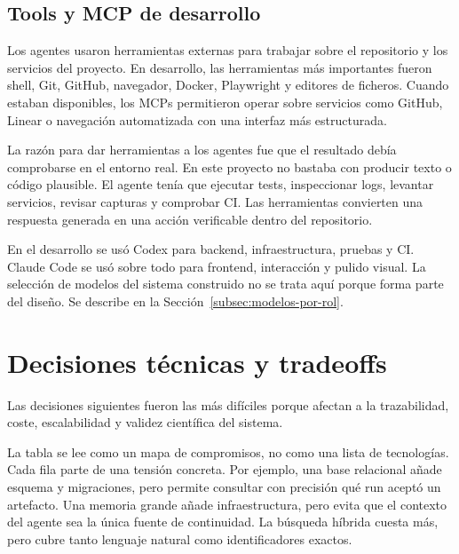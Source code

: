 \subsection{Tools y MCP de desarrollo}

Los agentes usaron herramientas externas para trabajar sobre el repositorio y
los servicios del proyecto. En desarrollo, las herramientas más importantes
fueron shell, Git, GitHub, navegador, Docker, Playwright y editores de ficheros.
Cuando estaban disponibles, los MCPs permitieron operar sobre servicios como
GitHub, Linear o navegación automatizada con una interfaz más estructurada.

La razón para dar herramientas a los agentes fue que el resultado debía
comprobarse en el entorno real. En este proyecto no bastaba con producir texto o
código plausible. El agente tenía que ejecutar tests, inspeccionar logs, levantar
servicios, revisar capturas y comprobar CI. Las herramientas convierten una
respuesta generada en una acción verificable dentro del repositorio.

En el desarrollo se usó Codex para backend, infraestructura, pruebas y CI.
Claude Code se usó sobre todo para frontend, interacción y pulido visual.
La selección de modelos del sistema construido no se trata aquí porque forma
parte del diseño. Se describe en la
Sección~\ref{subsec:modelos-por-rol}.

\section{Decisiones técnicas y tradeoffs}

Las decisiones siguientes fueron las más difíciles porque afectan a la
trazabilidad, coste, escalabilidad y validez científica del sistema.

La tabla se lee como un mapa de compromisos, no como una lista de tecnologías.
Cada fila parte de una tensión concreta. Por ejemplo, una base relacional añade
esquema y migraciones, pero permite consultar con precisión qué run aceptó un
artefacto. Una memoria grande añade infraestructura, pero evita que el contexto
del agente sea la única fuente de continuidad. La búsqueda híbrida cuesta más,
pero cubre tanto lenguaje natural como identificadores exactos.

